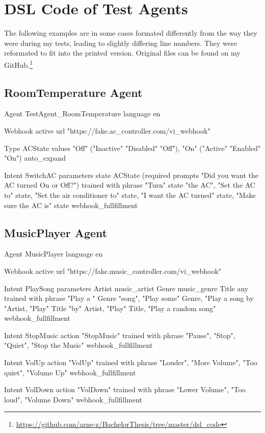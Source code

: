 \chapter{DSL Code of Test Agents}
The following examples are in some cases formated differently from the way they were during my tests, leading to slightly differing line numbers. They were reformated to fit into the printed version. Original files can be found on my GitHub.\footnote{\url{https://github.com/arne-z/BachelorThesis/tree/master/dsl_code}}

\section{RoomTemperature Agent}
\label{RoomTemperature Agent DSL}

\begin{DSL}
Agent TestAgent_RoomTemperature
  language en 
    
  Webhook 
    active 
    url "https://fake.ac_controller.com/vi_webhook"

  Type ACState
    values 
      "Off" ("Inactive" "Disabled" "Off"),
      "On" ("Active" "Enabled" "On")
  auto_expand

  Intent SwitchAC
    parameters
      state ACState (required prompts
        "Did you want the AC turned On or Off?")
    trained with phrase
      "Turn" state "the AC",
      "Set the AC to" state,
      "Set the air conditioner to" state,
      "I want the AC turned" state,
      "Make sure the AC is" state
    webhook_fullfillment
\end{DSL}

\pagebreak

\section{MusicPlayer Agent}
\label{MusicPlayer Agent DSL}

\begin{DSL}
Agent MusicPlayer
  language en
  
  Webhook
    active
    url "https://fake.music_controller.com/vi_webhook"
    
  Intent PlaySong
    parameters 
      Artist music_artist
      Genre music_genre
      Title any
    trained with phrase
      "Play a " Genre "song",
      "Play some" Genre,
      "Play a song by "Artist,
      "Play" Title "by" Artist,
      "Play" Title,
      "Play a random song"
    webhook_fullfillment
    
    Intent StopMusic
      action "StopMusic"
      trained with phrase
        "Pause",
        "Stop",
        "Quiet",
        "Stop the Music"
      webhook_fullfillment
    
    Intent VolUp
      action "VolUp"
      trained with phrase
        "Louder",
        "More Volume",
        "Too quiet",
        "Volume Up"
      webhook_fullfillment
      
    Intent VolDown
      action "VolDown"
      trained with phrase
        "Lower Volume",
        "Too loud",
        "Volume Down"
      webhook_fullfillment
\end{DSL}
\pagebreak


